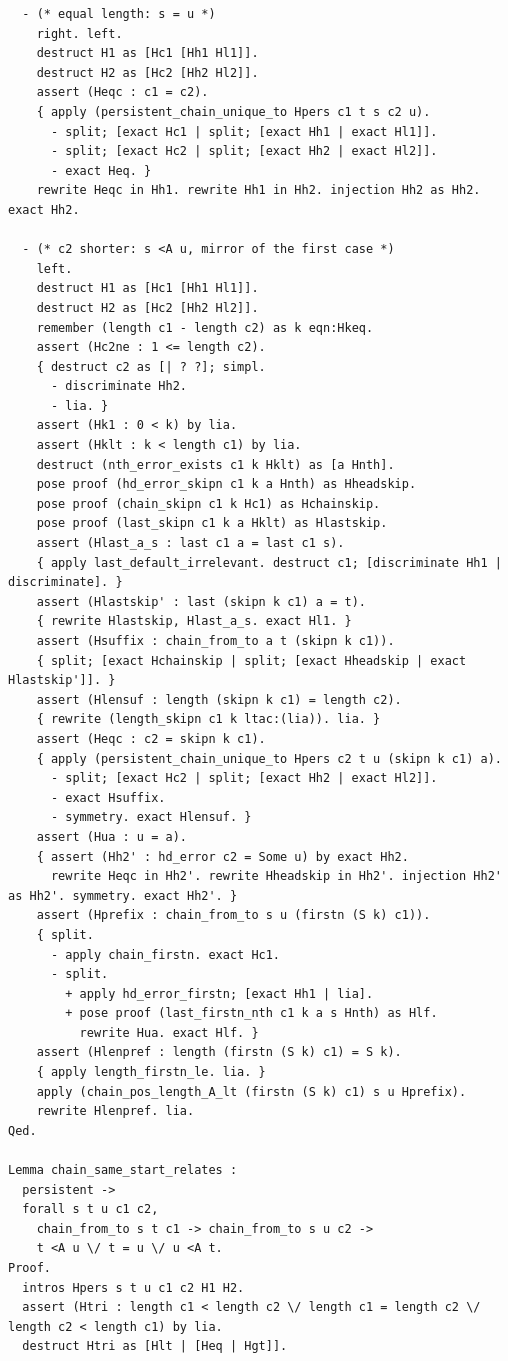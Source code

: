 \begin{latin}
\begin{verbatim}
  - (* equal length: s = u *)
    right. left.
    destruct H1 as [Hc1 [Hh1 Hl1]].
    destruct H2 as [Hc2 [Hh2 Hl2]].
    assert (Heqc : c1 = c2).
    { apply (persistent_chain_unique_to Hpers c1 t s c2 u).
      - split; [exact Hc1 | split; [exact Hh1 | exact Hl1]].
      - split; [exact Hc2 | split; [exact Hh2 | exact Hl2]].
      - exact Heq. }
    rewrite Heqc in Hh1. rewrite Hh1 in Hh2. injection Hh2 as Hh2. exact Hh2.

  - (* c2 shorter: s <A u, mirror of the first case *)
    left.
    destruct H1 as [Hc1 [Hh1 Hl1]].
    destruct H2 as [Hc2 [Hh2 Hl2]].
    remember (length c1 - length c2) as k eqn:Hkeq.
    assert (Hc2ne : 1 <= length c2).
    { destruct c2 as [| ? ?]; simpl.
      - discriminate Hh2.
      - lia. }
    assert (Hk1 : 0 < k) by lia.
    assert (Hklt : k < length c1) by lia.
    destruct (nth_error_exists c1 k Hklt) as [a Hnth].
    pose proof (hd_error_skipn c1 k a Hnth) as Hheadskip.
    pose proof (chain_skipn c1 k Hc1) as Hchainskip.
    pose proof (last_skipn c1 k a Hklt) as Hlastskip.
    assert (Hlast_a_s : last c1 a = last c1 s).
    { apply last_default_irrelevant. destruct c1; [discriminate Hh1 | discriminate]. }
    assert (Hlastskip' : last (skipn k c1) a = t).
    { rewrite Hlastskip, Hlast_a_s. exact Hl1. }
    assert (Hsuffix : chain_from_to a t (skipn k c1)).
    { split; [exact Hchainskip | split; [exact Hheadskip | exact Hlastskip']]. }
    assert (Hlensuf : length (skipn k c1) = length c2).
    { rewrite (length_skipn c1 k ltac:(lia)). lia. }
    assert (Heqc : c2 = skipn k c1).
    { apply (persistent_chain_unique_to Hpers c2 t u (skipn k c1) a).
      - split; [exact Hc2 | split; [exact Hh2 | exact Hl2]].
      - exact Hsuffix.
      - symmetry. exact Hlensuf. }
    assert (Hua : u = a).
    { assert (Hh2' : hd_error c2 = Some u) by exact Hh2.
      rewrite Heqc in Hh2'. rewrite Hheadskip in Hh2'. injection Hh2' as Hh2'. symmetry. exact Hh2'. }
    assert (Hprefix : chain_from_to s u (firstn (S k) c1)).
    { split.
      - apply chain_firstn. exact Hc1.
      - split.
        + apply hd_error_firstn; [exact Hh1 | lia].
        + pose proof (last_firstn_nth c1 k a s Hnth) as Hlf.
          rewrite Hua. exact Hlf. }
    assert (Hlenpref : length (firstn (S k) c1) = S k).
    { apply length_firstn_le. lia. }
    apply (chain_pos_length_A_lt (firstn (S k) c1) s u Hprefix).
    rewrite Hlenpref. lia.
Qed.

Lemma chain_same_start_relates :
  persistent ->
  forall s t u c1 c2,
    chain_from_to s t c1 -> chain_from_to s u c2 ->
    t <A u \/ t = u \/ u <A t.
Proof.
  intros Hpers s t u c1 c2 H1 H2.
  assert (Htri : length c1 < length c2 \/ length c1 = length c2 \/ length c2 < length c1) by lia.
  destruct Htri as [Hlt | [Heq | Hgt]].


\end{verbatim}
\end{latin}

